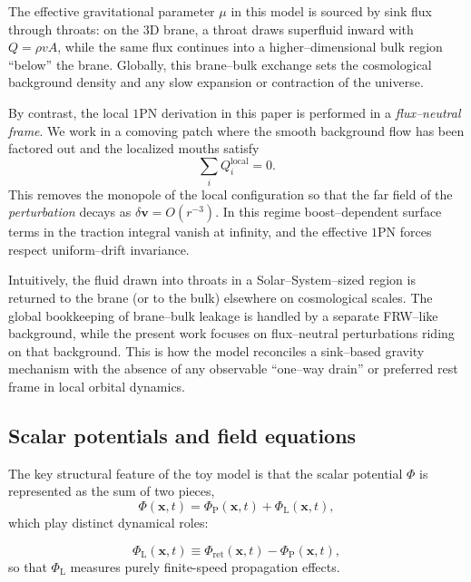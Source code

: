 \documentclass[11pt]{article}
\newcommand{\PhiP}{\Phi_{\mathrm{P}}}
\newcommand{\PhiL}{\Phi_{\mathrm{L}}}
\begin{document}
The effective gravitational parameter $\mu$ in this model is sourced by sink flux through throats: on the $3$D brane, a throat draws superfluid inward with $Q = \rho v A$, while the same flux continues into a higher--dimensional bulk region ``below'' the brane. Globally, this brane--bulk exchange sets the cosmological background density and any slow expansion or contraction of the universe.

By contrast, the local $1$PN derivation in this paper is performed in a \emph{flux--neutral frame}. We work in a comoving patch where the smooth background flow has been factored out and the localized mouths satisfy
\begin{equation}
  \sum_i Q_i^\mathrm{local} = 0 .
\end{equation}
This removes the monopole of the local configuration so that the far field of the \emph{perturbation} decays as $\delta \mathbf{v} = O(r^{-3})$. In this regime boost--dependent surface terms in the traction integral vanish at infinity, and the effective $1$PN forces respect uniform--drift invariance.

Intuitively, the fluid drawn into throats in a Solar--System--sized region is returned to the brane (or to the bulk) elsewhere on cosmological scales. The global bookkeeping of brane--bulk leakage is handled by a separate FRW--like background, while the present work focuses on flux--neutral perturbations riding on that background. This is how the model reconciles a sink--based gravity mechanism with the absence of any observable ``one--way drain'' or preferred rest frame in local orbital dynamics.

\subsection{Scalar potentials and field equations}
\label{sec:model_fields}

The key structural feature of the toy model is that the scalar potential $\Phi$ is represented as the sum of two pieces,
\begin{equation}
  \Phi(\mathbf{x},t) = \PhiP(\mathbf{x},t) + \PhiL(\mathbf{x},t),
\end{equation}
which play distinct dynamical roles:

\begin{equation}
  \PhiL(\mathbf{x},t) \equiv \Phi_{\mathrm{ret}}(\mathbf{x},t) - \PhiP(\mathbf{x},t),
\end{equation}
so that $\PhiL$ measures purely finite-speed propagation effects.
\end{document}
